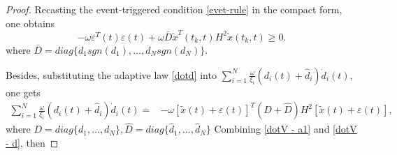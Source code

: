 \documentclass[review]{elsarticle}
\begin{document}
\begin{proof}
	
	Recasting the event-triggered condition \eqref{evet-rule} in the compact form, one obtains
	\begin{equation} \label{dotV - a1} 
-\omega\varepsilon^T(t)\varepsilon(t)+\omega\bar D\tilde{x}^T(t_k,t)H^2 \tilde{x}(t_k,t)\geq 0. 
	\end{equation} 
	where $\bar {D} = diag\{d_1sgn(d_1),\ldots,d_N sgn(d_N)\}$.
	
	Besides, substituting the adaptive law \eqref{dotd} into  $\sum_{i=1}^{N} \frac{\omega}{\xi_i}(d_i (t) + \hat{d}_i) \dot d_i (t)$, one gets
	\begin{equation}\label{dotV - d}
	\begin{split}
	\sum_{i=1}^{N} \frac{\omega}{\xi_i}(d_i (t) + \hat{d}_i) \dot d_i (t) =& - \omega\left[\tilde{x} (t) +  \varepsilon(t) \right]^T(D+\hat D)  H^2 \left[\tilde{x} (t) + \varepsilon(t) \right],
	\end{split}
	\end{equation}
	where $D=diag\{d_1,\ldots,d_N\},\hat{D}=diag\{\hat d_1,\ldots,\hat d_N\}$ Combining \eqref{dotV - a1} and \eqref{dotV - d}, then
	

\end{proof}
\end{document}
